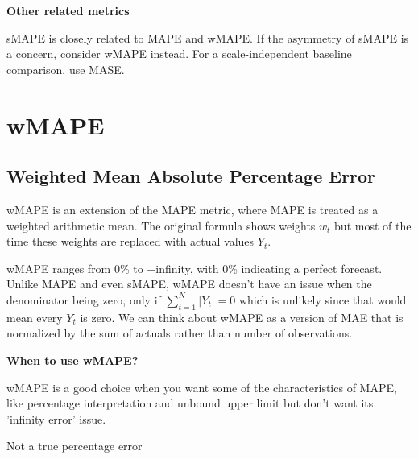 \textbf{Other related metrics}

sMAPE is closely related to MAPE and wMAPE. If the asymmetry of sMAPE is a concern, consider wMAPE instead.
For a scale-independent baseline comparison, use MASE.

\clearpage
\thispagestyle{regressionstyle}
\section{wMAPE}
\subsection{Weighted Mean Absolute Percentage Error}

wMAPE is an extension of the MAPE metric, where MAPE is treated as a weighted arithmetic mean. The original formula shows weights $w_{t}$ but most of the time these weights are replaced
with actual values $Y_{t}$.

\begin{center}
\end{center}


wMAPE ranges from 0\% to +infinity, with 0\% indicating a perfect forecast. Unlike MAPE and even sMAPE, wMAPE doesn't have an issue when the denominator being zero,
only if $\sum_{t=1}^{N}|Y_{t}| = 0$ which is unlikely since that would mean every $Y_{t}$ is zero. We can think about wMAPE as a version of MAE that is normalized by the sum of
actuals rather than number of observations.

\textbf{When to use wMAPE?}

wMAPE is a good choice when you want some of the characteristics of MAPE, like percentage interpretation and unbound upper limit but don't want its 'infinity error' issue.

{
    \item Not a true percentage error
}

